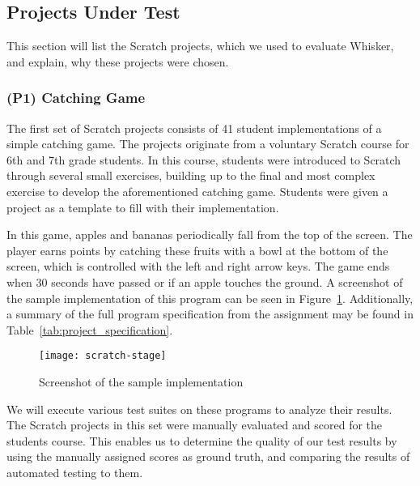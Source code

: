 \subsection{Projects Under Test}

This section will list the Scratch projects,
which we used to evaluate Whisker,
and explain, why these projects were chosen.

\subsubsection{(P1) Catching Game}

The first set of Scratch projects consists of 41 student implementations of a simple catching game.
The projects originate from a voluntary Scratch course for 6th and 7th grade students.
In this course, students were introduced to Scratch through several small exercises,
building up to the final and most complex exercise to develop the aforementioned catching game.
Students were given a project as a template to fill with their implementation.
\parspace

In this game, apples and bananas periodically fall from the top of the screen.
The player earns points by catching these fruits with a bowl at the bottom of the screen,
which is controlled with the left and right arrow keys.
The game ends when 30 seconds have passed or if an apple touches the ground.
A screenshot of the sample implementation of this program can be seen in Figure~\ref{fig:screenshot_of_the_sample_implementation}.
Additionally, a summary of the full program specification from the assignment may be found in Table~\ref{tab:project_specification}.
\parspace

\begin{figure}[htpb]
    \centering
    \texttt{[image: scratch-stage]}
    \caption{Screenshot of the sample implementation}
    \label{fig:screenshot_of_the_sample_implementation}
\end{figure}

We will execute various test suites on these programs to analyze their results.
The Scratch projects in this set were manually evaluated and scored for the students course.
This enables us to determine the quality of our test results by using the manually assigned scores as ground truth,
and comparing the results of automated testing to them.
\parspace

